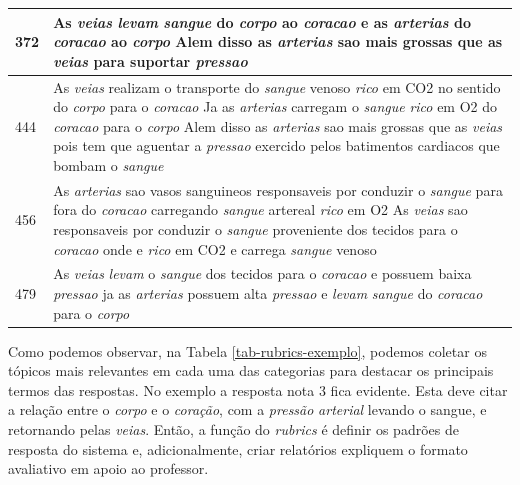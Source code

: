 \begin{table}[!h]
\begin{tabular}{ p{2cm} | p{14cm}}
372 & As \textit{veias} \textit{levam} \textit{sangue} do \textit{corpo} ao \textit{coracao} e as \textit{arterias} do \textit{coracao} ao \textit{corpo} Alem disso as \textit{arterias} sao mais grossas que as \textit{veias} para suportar \textit{pressao}\\ \hline
444 & As \textit{veias} realizam o transporte do \textit{sangue} venoso \textit{rico} em CO2 no sentido do \textit{corpo} para o \textit{coracao} Ja as \textit{arterias} carregam o \textit{sangue} \textit{rico} em O2 do \textit{coracao} para o \textit{corpo} Alem disso as \textit{arterias} sao mais grossas que as \textit{veias} pois tem que aguentar a \textit{pressao} exercido pelos batimentos cardiacos que bombam o \textit{sangue}\\ \hline
456 & As \textit{arterias} sao vasos sanguineos responsaveis por conduzir o \textit{sangue} para fora do \textit{coracao} carregando \textit{sangue} artereal \textit{rico} em O2 As \textit{veias} sao responsaveis por conduzir o \textit{sangue} proveniente dos tecidos para o \textit{coracao} onde e \textit{rico} em CO2 e carrega \textit{sangue} venoso\\ \hline
479 & As \textit{veias} \textit{levam} o \textit{sangue} dos tecidos para o \textit{coracao} e possuem baixa \textit{pressao} ja as \textit{arterias} possuem alta \textit{pressao} e \textit{levam} \textit{sangue} do \textit{coracao} para o \textit{corpo}\\ \hline
\hline
\end{tabular}
\end{table}

Como podemos observar, na Tabela \ref{tab-rubrics-exemplo}, podemos coletar os tópicos mais relevantes em cada uma das categorias para destacar os principais termos das respostas. No exemplo a resposta nota 3 fica evidente. Esta deve citar a relação entre o \textit{corpo} e o \textit{coração}, com a \textit{pressão} \textit{arterial} levando o sangue, e retornando pelas \textit{veias}. Então, a função do \textit{rubrics} é definir os padrões de resposta do sistema e, adicionalmente, criar relatórios expliquem o formato avaliativo em apoio ao professor.
